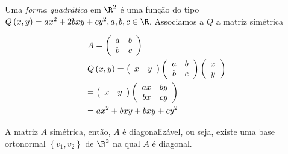 \documentclass{book}
\begin{document}
\begin{defn}
\begin{sloppypar}
Uma \textit{forma quadr\'atica} em $\R^2$ \'e uma fun\c c\~ao do tipo ${Q\left( {x,y} \right) = ax^2  + 2bxy + cy^2 ,a,b,c \in \R}$.
Associamos a $Q$ a matriz sim\'etrica
\end{sloppypar}

\[
\begin{gathered}
A = \left( {\begin{array}{*{20}c}
a & b  \\
b & c  \\

\end{array} } \right) \hfill \\
Q\left( {x,y} \right) = \left( {\begin{array}{*{20}c}
x & y  \\

\end{array} } \right)\left( {\begin{array}{*{20}c}
a & b  \\
b & c  \\

\end{array} } \right)\left( {\begin{array}{*{20}c}
x  \\
y  \\

\end{array} } \right) \hfill \\
= \left( {\begin{array}{*{20}c}
x & y  \\

\end{array} } \right)\left( {\begin{array}{*{20}c}
{ax} & {by}  \\
{bx} & {cy}  \\

\end{array} } \right) \hfill \\
= ax^2  + bxy + bxy + cy^2  \hfill \\
\end{gathered}
\]

\end{defn}

A matriz $A$ sim\'etrica, ent\~ao, $A$ \'e diagonaliz\'avel, ou seja, existe uma base ortonormal $\left\{ {v_1 ,v_2 } \right\}$ de $\R^2$ na qual $A$ \'e diagonal.
\end{document}
